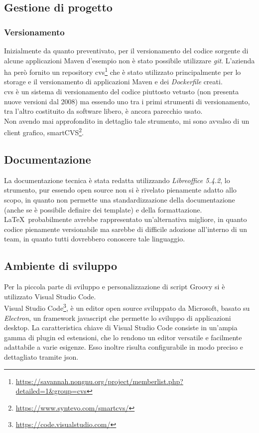 {\subsection{Gestione di progetto}

\subsubsection{Versionamento}
Inizialmente da quanto preventivato, per il versionamento del codice sorgente di alcune applicazioni Maven d'esempio non è stato possibile utilizzare \textit{git}. L'azienda ha però fornito un \gls{repository} \gls{cvs}\footnote{\url{https://savannah.nongnu.org/project/memberlist.php?detailed=1&group=cvs}} che è stato utilizzato principalmente per lo storage e il versionamento di applicazioni Maven e dei \textit{Dockerfile} creati. \\

\gls{cvs} è un sistema di versionamento del codice piuttosto vetusto (non presenta nuove versioni dal 2008) ma essendo uno tra i primi strumenti di versionamento, tra l'altro costituito da software libero, è ancora parecchio usato. \\
Non avendo mai approfondito in dettaglio tale strumento, mi sono avvalso di un client grafico, smartCVS\footnote{\url{https://www.syntevo.com/smartcvs/}}.

\subsection{Documentazione}
La documentazione tecnica è stata redatta utilizzando \textit{Libreoffice 5.4.2}, lo strumento, pur essendo open source non si è rivelato pienamente adatto allo scopo, in quanto non permette una standardizzazione della documentazione (anche se è possibile definire dei template) e della formattazione. \LaTeX\ probabilmente avrebbe rappresentato un'alternativa migliore, in quanto codice pienamente versionabile ma sarebbe di difficile adozione all'interno di un team, in quanto tutti dovrebbero conoscere tale linguaggio. 

\subsection{Ambiente di sviluppo}
Per la piccola parte di sviluppo e personalizzazione di script Groovy si è utilizzato Visual Studio Code. \\
Visual Studio Code\footnote{\url{https://code.visualstudio.com/}}, è un editor open source sviluppato da Microsoft, basato su \textit{Electron}, un framework javascript che permette lo sviluppo di applicazioni desktop.
La caratteristica chiave di Visual Studio Code consiste in un'ampia gamma di \gls{plugin} ed estensioni, che lo rendono un editor versatile e facilmente adattabile a varie esigenze. Esso inoltre risulta configurabile in modo preciso e dettagliato tramite \gls{json}. 

}
